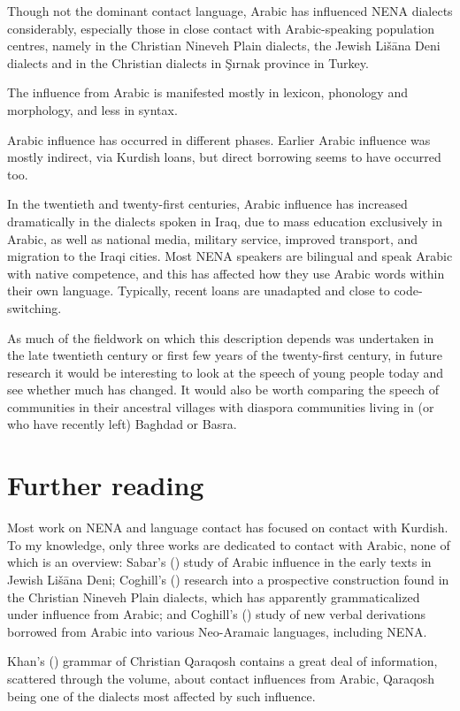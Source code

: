 \documentclass[output=paper]{langsci/langscibook}
\begin{document}
Though not the dominant contact language, Arabic has influenced NENA dialects considerably, especially those in close contact with Arabic-speaking population centres, namely in the Christian Nineveh Plain dialects, the Jewish Lišāna Deni dialects and in the Christian dialects in Şırnak province in Turkey.

The influence from Arabic is manifested mostly in lexicon, phonology and morphology, and less in syntax.

Arabic influence has occurred in different phases. Earlier Arabic influence was mostly indirect, via Kurdish loans, but direct borrowing seems to have occurred too.

In the twentieth and twenty-first centuries, Arabic influence has increased dramatically in the dialects spoken in Iraq, due to mass education exclusively in Arabic, as well as national media, military service, improved transport, and migration to the Iraqi cities. Most NENA speakers are bilingual and speak Arabic with native competence, and this has affected how they use Arabic words within their own language. Typically, recent loans are unadapted and close to code-switching.

As much of the fieldwork on which this description depends was undertaken in the late twentieth century or first few years of the twenty-first century, in future research it would be interesting to look at the speech of young people today and see whether much has changed. It would also be worth comparing the speech of communities in their ancestral villages with diaspora communities living in (or who have recently left) Baghdad or Basra.

\section*{Further reading}

Most work on NENA and language contact has focused on contact with Kurdish. To my knowledge, only three works are dedicated to contact with Arabic, none of which is an overview: Sabar's (\citeyear{Sabar1984}) study of Arabic influence in the early texts in Jewish Lišāna Deni; Coghill’s (\citeyear{Coghill2010,Coghill2012}) research into a prospective construction found in the Christian Nineveh Plain dialects, which has apparently grammaticalized under influence from Arabic; and Coghill's (\citeyear{Coghill2015}) study of new verbal derivations borrowed from Arabic into various Neo-Aramaic languages, including NENA.

Khan's (\citeyear{Khan2002}) grammar of Christian Qaraqosh contains a great deal of information, scattered through the volume, about contact influences from Arabic, Qaraqosh being one of the dialects most affected by such influence.
\end{document}
